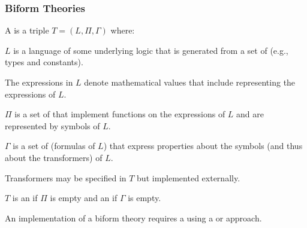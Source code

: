 \documentclass[t,12pt,numbers,fleqn]{beamer}
\begin{document}
\begin{frame}
\frametitle{Biform Theories {\small \bbrown{[FM03,CF08]}}}
\bi

  \item A  is a triple $T =
    (L,\Pi,\Gamma)$ where:

  \be

    \item $L$ is a language of some underlying logic that is generated from a
      set of  (e.g., types and constants).

    \item The expressions in $L$ denote mathematical values that
      include  representing the expressions of
      $L$.

    \item $\Pi$ is a set of  that implement
      functions on the expressions of $L$ and are represented by
      symbols of $L$.

    \item $\Gamma$ is a set of  (formulas of $L$) that
      express properties about the symbols (and thus about the
      transformers) of $L$.

  \ee

  \item Transformers may be specified in $T$ but implemented externally.

  \item $T$ is an  if $\Pi$ is empty and an
     if $\Gamma$ is empty.

  \item An implementation of a biform theory requires a
     using a
     or  approach.

\ei
\end{frame}

\end{document}
